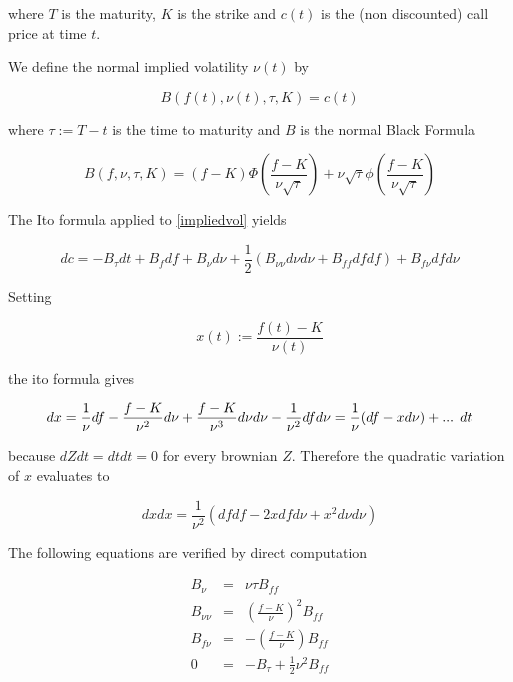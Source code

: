 \documentclass{amsart}
\theoremstyle{plain}
\numberwithin{equation}{section}
\begin{document}
where $T$ is the maturity, $K$ is the strike and $c(t)$ is the (non discounted) call price at time $t$.

We define the normal implied volatility $\nu(t)$ by

\begin{equation} \label{impliedvol}
B(f(t),\nu(t),\tau,K) = c(t)
\end{equation}

where $\tau := T-t$ is the time to maturity and $B$ is the normal Black Formula

\begin{equation}
B(f,\nu,\tau,K) = (f-K) \Phi \left( \frac{f-K}{\nu\sqrt{\tau}} \right) + 
                                   \nu\sqrt{\tau} \phi \left( \frac{f-K}{\nu\sqrt{\tau}} \right)
\end{equation}

The Ito formula applied to \ref{impliedvol} yields

\begin{equation} \label{cdynamic}
dc = -B_\tau dt + B_f df + B_\nu d\nu + \frac{1}{2} \left( B_{\nu\nu} d\nu d\nu + B_{ff} df df \right) + B_{f\nu} df d\nu 
\end{equation}

Setting 

\begin{equation}
x(t) := \frac{f(t)-K}{\nu(t)}
\end{equation}

the ito formula gives

\begin{equation}
dx = \frac{1}{\nu} df - \frac{f-K}{\nu^2} d\nu + \frac{f-K}{\nu^3} d\nu d\nu - \frac{1}{\nu^2} dfd\nu
 = \frac{1}{\nu} ( df - x d\nu ) + \textnormal{... }dt
\end{equation} 

because $dZ dt = dt dt = 0$ for every brownian $Z$. Therefore the quadratic variation of $x$ evaluates to

\begin{equation} \label{quadVarX}
dx dx = \frac{1}{\nu^2} ( df df - 2 x df d\nu + x^2 d\nu d\nu )
\end{equation}

The following equations are verified by direct computation

\begin{eqnarray} \label{propB}
B_\nu &=& \nu \tau B_{ff} \\
B_{\nu\nu} &=& \left( \frac{f-K}{\nu} \right) ^2 B_{ff} \\
B_{f \nu} &=& - \left( \frac{f-K}{\nu} \right) B_{ff} \\
0 &=& -B_\tau + \frac{1}{2} \nu^2 B_{ff}
\end{eqnarray}
\end{document}

